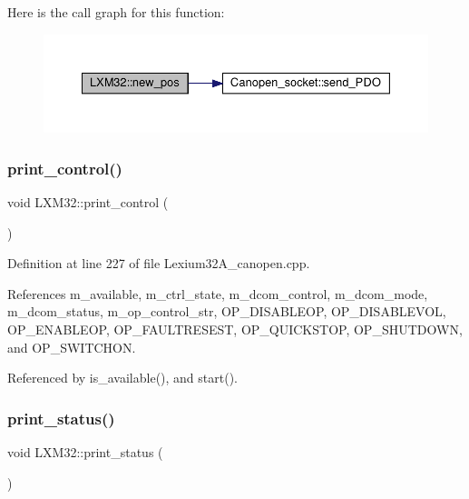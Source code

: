 Here is the call graph for this function\+:\nopagebreak
\begin{figure}[H]
\begin{center}
\leavevmode
\includegraphics[width=350pt]{class_l_x_m32_a3b470e3d484fc0fb2a208df10a8e29e7_cgraph}
\end{center}
\end{figure}
\mbox{\label{class_l_x_m32_a545b23fab3528a8039bb2cc62808f9f5}} 
\subsubsection{\texorpdfstring{print\+\_\+control()}{print\_control()}}
{\footnotesize\ttfamily void L\+X\+M32\+::print\+\_\+control (\begin{DoxyParamCaption}{ }\end{DoxyParamCaption})}



Definition at line 227 of file Lexium32\+A\+\_\+canopen.\+cpp.



References m\+\_\+available, m\+\_\+ctrl\+\_\+state, m\+\_\+dcom\+\_\+control, m\+\_\+dcom\+\_\+mode, m\+\_\+dcom\+\_\+status, m\+\_\+op\+\_\+control\+\_\+str, O\+P\+\_\+\+D\+I\+S\+A\+B\+L\+E\+OP, O\+P\+\_\+\+D\+I\+S\+A\+B\+L\+E\+V\+OL, O\+P\+\_\+\+E\+N\+A\+B\+L\+E\+OP, O\+P\+\_\+\+F\+A\+U\+L\+T\+R\+E\+S\+E\+ST, O\+P\+\_\+\+Q\+U\+I\+C\+K\+S\+T\+OP, O\+P\+\_\+\+S\+H\+U\+T\+D\+O\+WN, and O\+P\+\_\+\+S\+W\+I\+T\+C\+H\+ON.



Referenced by is\+\_\+available(), and start().

\mbox{\label{class_l_x_m32_a201d8f9da28994a92612e2618b7a1167}} 
\subsubsection{\texorpdfstring{print\+\_\+status()}{print\_status()}}
{\footnotesize\ttfamily void L\+X\+M32\+::print\+\_\+status (\begin{DoxyParamCaption}{ }\end{DoxyParamCaption})}



